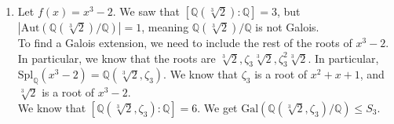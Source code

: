 \documentclass[10pt]{extarticle}
\newcommand{\Q}{\mathbb{Q}}
\begin{document}
\begin{enumerate}[(1)]
\begin{center}
      \end{center}
    \item Let $f(x) = x^3 - 2$. We saw that $[\Q(\sqrt[3]{2}):\Q] = 3$, but $|\text{Aut}(\Q(\sqrt[3]{2})/\Q)| = 1$, meaning $\Q(\sqrt[3]{2})/\Q$ is not Galois.\\

      To find a Galois extension, we need to include the rest of the roots of $x^3 - 2$. In particular, we know that the roots are $\sqrt[3]{2},\zeta_3\sqrt[3]{2},\zeta_3^2\sqrt[3]{2}$. In particular, $\text{Spl}_{\Q}(x^3 - 2) = \Q(\sqrt[3]{2},\zeta_3)$. We know that $\zeta_3$ is a root of $x^2 + x + 1$, and $\sqrt[3]{2}$ is a root of $x^3 - 2$.\\

      We know that $[\Q(\sqrt[3]{2},\zeta_3):\Q] = 6$. We get $\text{Gal}(\Q(\sqrt[3]{2},\zeta_3)/\Q)\leq S_{3}$.\\


\end{enumerate}
\end{document}
